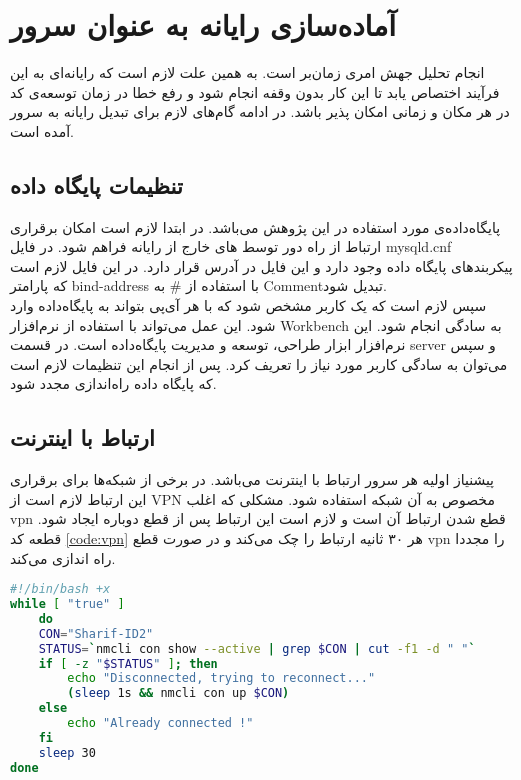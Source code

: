  
\chapter{آماده‌سازی رایانه به عنوان سرور}
\label{app:server}
انجام تحلیل جهش امری زمان‌بر است. به همین علت لازم است که رایانه‌ای به این فرآیند اختصاص یابد تا  این کار بدون وقفه انجام شود و رفع خطا در زمان توسعه‌ی کد در هر مکان و زمانی امکان پذیر باشد. در ادامه گام‌های لازم برای تبدیل رایانه به سرور آمده است. 

\section{تنظیمات پایگاه داده}
پایگاه‌داده‌ی  مورد استفاده در این پژوهش  می‌باشد. در ابتدا لازم است امکان برقراری ارتباط از راه دور توسط ‌های خارج از رایانه فراهم شود. در فایل   mysqld.cnf پیکربندهای پایگاه داده وجود دارد و این فایل در آدرس 
قرار دارد. در این فایل لازم است که پارامتر bind-address با استفاده از \# به  {Comment}تبدیل شود. \\ 
سپس لازم است که یک کاربر مشخص شود که با هر آی‌پی بتواند به پایگاه‌داده وارد شود. این عمل می‌تواند با استفاده از نرم‌افزار  Workbench به سادگی انجام شود. این نرم‌افزار ابزار طراحی، توسعه و مدیریت پایگاه‌داده است. در قسمت server و سپس
  می‌توان به سادگی کاربر مورد نیاز را تعریف کرد. پس از انجام این تنظیمات لازم است که پایگاه داده راه‌اندازی مجدد شود. 
  
\section{ارتباط با اینترنت}
پیشنیاز اولیه هر سرور ارتباط با اینترنت می‌باشد. در برخی از شبکه‌ها برای برقراری این ارتباط لازم است از VPN مخصوص به آن شبکه استفاده شود. مشکلی که اغلب  vpn قطع شدن ارتباط آن است و لازم است این ارتباط پس از قطع دوباره ایجاد شود. قطعه کد  \ref{code:vpn} هر ۳۰ ثانیه ارتباط را چک می‌کند و در صورت قطع vpn را مجددا راه اندازی می‌کند. 




\begin{latin}
	\begin{lstlisting}[language=bash]
#!/bin/bash +x
while [ "true" ]
	do
	CON="Sharif-ID2"
	STATUS=`nmcli con show --active | grep $CON | cut -f1 -d " "`
	if [ -z "$STATUS" ]; then
		echo "Disconnected, trying to reconnect..."
		(sleep 1s && nmcli con up $CON)
	else
		echo "Already connected !"
	fi
	sleep 30
done
\end{lstlisting}
\end{latin}
\label{code:vpn}

